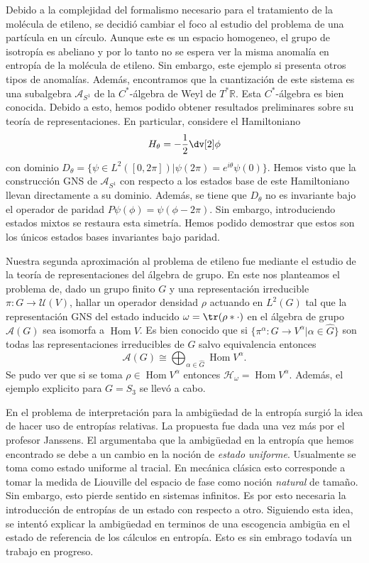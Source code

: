 \documentclass{article}
\DeclareMathOperator{\Hom}{Hom}
\begin{document}
Debido a la complejidad del formalismo necesario para el tratamiento de la molécula de etileno, se decidió cambiar el foco al estudio del problema de una partícula en un círculo. Aunque este es un espacio homogeneo, el grupo de isotropía es abeliano y por lo tanto no se espera ver la misma anomalía en entropía de la molécula de etileno. Sin embargo, este ejemplo si presenta otros tipos de anomalías\cite{Balachandran2011}. Además, encontramos que la cuantización de este sistema es una subalgebra $\mathcal{A}_{S^1}$ de la $C^*$-álgebra de Weyl de $T^*\mathbb{R}$. Esta $C^*$-álgebra es bien conocida\cite{Moretti2013}. Debido a esto, hemos podido obtener resultados preliminares sobre su teoría de representaciones. En particular, considere el Hamiltoniano 
\begin{equation}
H_\theta=-\frac{1}{2}\dv[2]\phi
\end{equation} 
con dominio $D_\theta=\{\psi\in L^2([0,2\pi])|\psi(2\pi)=e^{i\theta}\psi(0)\}$. Hemos visto que la construcción GNS de $\mathcal{A}_{S^1}$ con respecto a los estados base de este Hamiltoniano llevan directamente a su dominio. Además, se tiene que $D_\theta$ no es invariante bajo el operador de paridad $P\psi(\phi)=\psi(\phi-2\pi)$. Sin embargo, introduciendo estados mixtos se restaura esta simetría. Hemos podido demostrar que estos son los únicos estados bases invariantes bajo paridad.

Nuestra segunda aproximación al problema de etileno fue mediante el estudio de la teoría de representaciones del álgebra de grupo. En este nos planteamos el problema de, dado un grupo finito $G$ y una representación irreducible $\pi:G\rightarrow\mathcal{U}(V)$, hallar un operador densidad $\rho$ actuando en $L^2(G)$ tal que la representación GNS del estado inducido $\omega=\tr(\rho*\cdot)$ en el álgebra de grupo $\mathcal{A}(G)$ sea isomorfa a $\Hom V$. Es bien conocido que si $\{\pi^\alpha:G\rightarrow V^\alpha|\alpha\in\hat{G}\}$ son todas las representaciones irreducibles de $G$ salvo equivalencia entonces 
\begin{equation}
\mathcal{A}(G)\cong\bigoplus_{\alpha\in\hat{G}}\Hom V^\alpha.
\end{equation}
Se pudo ver que si se toma $\rho\in\Hom V^\alpha$ entonces $\mathcal{H}_\omega=\Hom V^\alpha$. Además, el ejemplo explicito para $G=S_3$ se llevó a cabo.

En el problema de interpretación para la ambigüedad de la entropía surgió la idea de hacer uso de entropías relativas. La propuesta fue dada una vez más por el profesor Janssens. El argumentaba que la ambigüedad en la entropía que hemos encontrado se debe a un cambio en la noción de \textit{estado uniforme}. Usualmente se toma como estado uniforme al tracial. En mecánica clásica esto corresponde a tomar la medida de Liouville del espacio de fase como noción \textit{natural} de tamaño. Sin embargo, esto pierde sentido en sistemas infinitos. Es por esto necesaria la introducción de entropías de un estado con respecto a otro. Siguiendo esta idea, se intentó explicar la ambigüedad en terminos de una escogencia ambigüa en el estado de referencia de los cálculos en entropía. Esto es sin embrago todavía un trabajo en progreso.  
\end{document}
